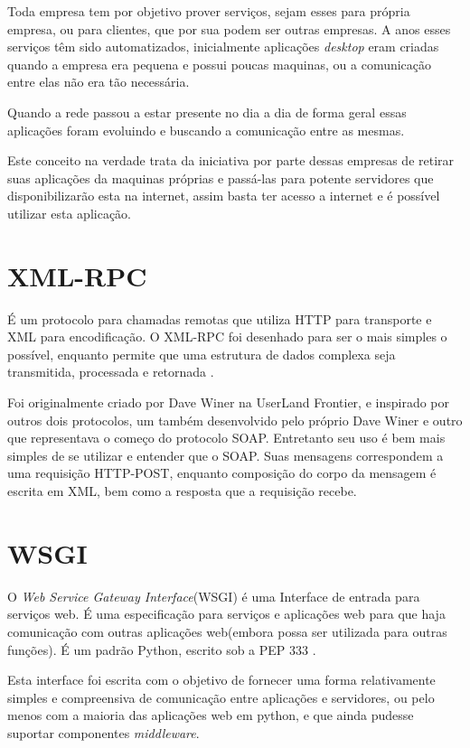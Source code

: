 Toda empresa tem por objetivo prover serviços, sejam esses para própria empresa, ou para clientes, que por sua podem ser outras empresas. A anos esses serviços têm sido automatizados, inicialmente aplicações \textit{desktop} eram criadas quando a empresa era pequena e possui poucas maquinas, ou a comunicação entre elas não era tão necessária.

Quando a rede passou a estar presente no dia a dia de forma geral essas aplicações foram evoluindo e buscando a comunicação entre as mesmas.

Este conceito na verdade trata da iniciativa por parte dessas empresas de retirar suas aplicações da maquinas próprias e passá-las para potente servidores que disponibilizarão esta na internet, assim basta ter acesso a internet e é possível utilizar esta aplicação.

\section{XML-RPC}

É um protocolo para chamadas remotas que utiliza HTTP para transporte e XML para encodificação. O XML-RPC foi desenhado para ser o mais simples o possível, enquanto permite que uma estrutura de dados complexa seja transmitida, processada e retornada \cite{XMLRPC}.

Foi originalmente criado por Dave Winer na UserLand Frontier, e inspirado por outros dois protocolos, um também desenvolvido pelo próprio Dave Winer e outro que representava o começo do protocolo SOAP. Entretanto seu uso é bem mais simples de se utilizar e entender que o SOAP. Suas mensagens correspondem a uma requisição HTTP-POST, enquanto composição do corpo da mensagem é escrita em XML, bem como a resposta que a requisição recebe.

\section{WSGI}

O \textit{Web Service Gateway Interface}(WSGI) é uma Interface de entrada para serviços web. É uma especificação para serviços e aplicações web para que haja comunicação com outras aplicações web(embora possa ser utilizada para outras funções). É um padrão Python, escrito sob a PEP 333 \cite{WSGI}.

Esta interface foi escrita com o objetivo de fornecer uma forma relativamente simples e compreensiva de comunicação entre aplicações e servidores, ou pelo menos com a maioria das aplicações web em python, e que ainda pudesse suportar componentes \textit{middleware}.


